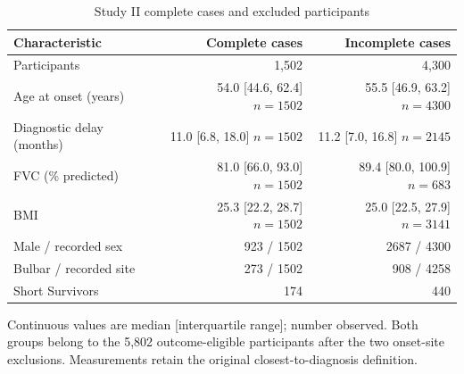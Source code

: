 \begin{table}[ht!]
\centering
\small
\caption[Study II complete cases and excluded participants]{Study II complete cases and excluded participants}
\label{tab:review_s2_selection}
\setlength{\tabcolsep}{4pt}
\begin{tabular}{lrr}
\toprule
Characteristic & Complete cases & Incomplete cases \\
\midrule
Participants & 1,502 & 4,300 \\
Age at onset (years) & \shortstack{54.0 [44.6, 62.4] \\ $n=1502$} & \shortstack{55.5 [46.9, 63.2] \\ $n=4300$} \\
Diagnostic delay (months) & \shortstack{11.0 [6.8, 18.0] \\ $n=1502$} & \shortstack{11.2 [7.0, 16.8] \\ $n=2145$} \\
FVC (\% predicted) & \shortstack{81.0 [66.0, 93.0] \\ $n=1502$} & \shortstack{89.4 [80.0, 100.9] \\ $n=683$} \\
BMI & \shortstack{25.3 [22.2, 28.7] \\ $n=1502$} & \shortstack{25.0 [22.5, 27.9] \\ $n=3141$} \\
Male / recorded sex & 923 / 1502 & 2687 / 4300 \\
Bulbar / recorded site & 273 / 1502 & 908 / 4258 \\
Short Survivors & 174 & 440 \\
\bottomrule
\end{tabular}
\par\smallskip
\begin{minipage}{0.98\linewidth}\footnotesize
Continuous values are median [interquartile range]; number observed. Both groups belong to the 5,802 outcome-eligible participants after the two onset-site exclusions. Measurements retain the original closest-to-diagnosis definition.
\end{minipage}
\end{table}
